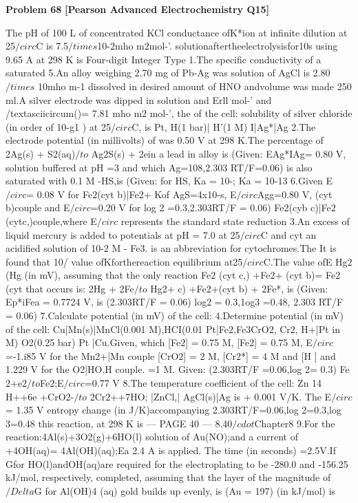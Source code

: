 \begin{problembox}
\textbf{Problem 68} \hfill \textbf{[Pearson Advanced Electrochemistry Q15]}
\label{q:ext-pearson-68}

The pH of 100 L of concentrated KCl
conductance ofK*ion at infinite dilution
at 25$/circ$C is 7.5$/times$10-$2$mho m$2$mol-'.
solutionaftertheelectrolysisfor10s
using 9.65 A at 298 K is
Four-digit Integer Type
1.The specific conductivity of a saturated
5.An alloy weighing 2.70 mg of Pb-Ag was
solution of AgCl is 2.80 $/times$ 10mho m-1
dissolved in desired amount of HNO
andvolume was made 250 ml.A silver
electrode was dipped in solution and Erll
mol-' and /textasciicircum()= 7.81 mho m$2$ mol-', the
of the cell:
solubility of silver chloride (in order of
10-g1 ) at 25$/circ$C, is
Pt, H(1 bar)| H'(1 M) I|Ag*|Ag
2.The electrode potential (in millivolts) of
was 0.50 V at 298 K.The percentage of
2Ag(s) + S$2$(aq)$/to$ Ag2S(s) + 2ein a
lead in alloy is (Given: EAg*IAg= 0.80 V,
solution buffered at pH =3 and which
Ag=108,2.303 RT/F=0.06)
is also saturated with 0.1 M -HS,is
(Given: for HS, Ka = 10-; Ka = 10-13
6.Given E$/circ$= 0.08 V for Fe$2$(cyt b)|Fe2+
Kof AgS=4x10-s, E$/circ$Agg=0.80 V,
(cyt b)couple and E$/circ$=0.20 V for
log 2 =0.3,2.303RT/F = 0.06)
Fe$2$(cyb c)|Fe$2$(cytc,)couple,where E$/circ$
represents the standard state reduction
3.An excess of liquid mercury is added to
potentials at pH = 7.0 at 25$/circ$C and cyt
an acidified solution of 10-$2$ M - Fe3.
is an abbreviation for cytochromes.The
It is found that 10/%
value ofKforthereaction
equilibrium at25$/circ$C.The value ofE
Hg$2$(Hg
(in mV), assuming that the only reaction
Fe$2$ (cyt c,) +Fe$2$+ (cyt b)= Fe$2$ (cyt
that occurs is: 2Hg + 2Fe$/to$ Hg2+
c) +Fe$2$+(cyt b)
+ 2Fe*, is (Given: Ep*iFea = 0.7724 V,
is (2.303RT/F = 0.06)
log2 = 0.3,1og3 =0.48, 2.303 RT/F = 0.06)
7.Calculate potential (in mV) of the cell:
4.Determine potential (in mV) of the cell:
Cu|Mn(s)|MnCl(0.001 M),HCI(0.01
Pt|Fe$2$,Fe3CrO$2$, Cr$2$, H+|Pt in
M) O2(0.25 bar) Pt |Cu.Given,
which [Fe$2$] = 0.75 M, [Fe$2$] = 0.75 M,
E$/circ$=-1.i85 V for the Mn$2$+|Mn couple
[CrO$2$] = 2 M, [Cr$2$*] = 4 M and [H ]
and 1.229 V for the O2|HO,H couple.
=1 M. Given:
(2.303RT/F =0.06,log 2= 0.3)
Fe$2$+e$2$$/to$Fe$2$;E$/circ$=0.77 V
8.The temperature coefficient of the cell: Zn
14 H++6e +CrO$2$-$/to$ 2Cr$2$++7HO;
|ZnCl,| AgCl(s)|Ag is + 0.001 V/K. The
E$/circ$ = 1.35 V
entropy change (in J/K)accompanying
2.303RT/F=0.06,log 2=0.3,log 3=0.48
this reaction, at 298 K is
--- PAGE 40 ---
8.40$/cdot$Chapter8
9.For the reaction:4Al(s)+3O2(g)+6HO(l)
solution of Au(NO);and a current of
+4OH(aq)= 4Al(OH)(aq);Ea
2.4 A is applied. The time (in seconds)
=2.5V.If Gfor HO(l)andOH(aq)are
required for the electroplating to be
-280.0 and -156.25 kJ/mol, respectively,
completed, assuming that the layer of
the magnitude of $/Delta$G for Al(OH)4 (aq)
gold builds up evenly, is (Au = 197)
(in kJ/mol) is
\end{problembox}

